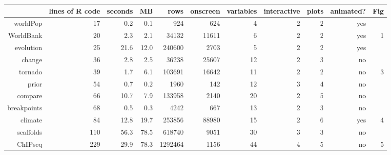 \begin{tabular}{rrrrrrrrrrr}
  \hline
 & lines of R code & seconds & MB & rows & onscreen & variables & interactive & plots & animated? & Fig \\ 
  \hline
worldPop & 17 & 0.2 & 0.1 & 924 & 624 &  4 &  2 &  2 & yes &  \\ 
  WorldBank & 20 & 2.3 & 2.1 & 34132 & 11611 &  6 &  2 &  2 & yes &  1 \\ 
  evolution & 25 & 21.6 & 12.0 & 240600 & 2703 &  5 &  2 &  2 & yes &  \\ 
  change & 36 & 2.8 & 2.5 & 36238 & 25607 & 12 &  2 &  3 & no &  \\ 
  tornado & 39 & 1.7 & 6.1 & 103691 & 16642 & 11 &  2 &  2 & no &  3 \\ 
  prior & 54 & 0.7 & 0.2 & 1960 & 142 & 12 &  3 &  4 & no &  \\ 
  compare & 66 & 10.7 & 7.9 & 133958 & 2140 & 20 &  2 &  5 & no &  \\ 
  breakpoints & 68 & 0.5 & 0.3 & 4242 & 667 & 13 &  2 &  3 & no &  \\ 
  climate & 84 & 12.8 & 19.7 & 253856 & 88980 & 15 &  2 &  6 & yes &  4 \\ 
  scaffolds & 110 & 56.3 & 78.5 & 618740 & 9051 & 30 &  3 &  3 & no &  \\ 
  ChIPseq & 229 & 29.9 & 78.3 & 1292464 & 1156 & 44 &  4 &  5 & no &  5 \\ 
   \hline
\end{tabular}
